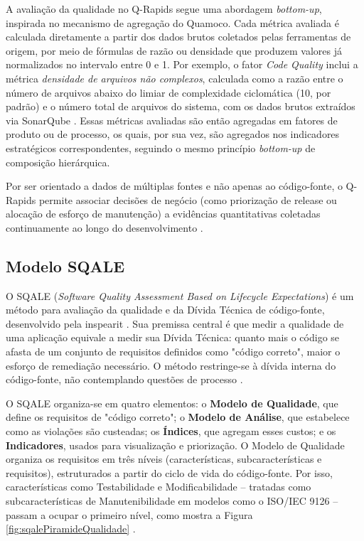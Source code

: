 A avaliação da qualidade no Q-Rapids segue uma abordagem \textit{bottom-up}, inspirada no mecanismo de agregação do Quamoco. Cada métrica avaliada é calculada diretamente a partir dos dados brutos coletados pelas ferramentas de origem, por meio de fórmulas de razão ou densidade que produzem valores já normalizados no intervalo entre 0 e 1. Por exemplo, o fator \textit{Code Quality} inclui a métrica \textit{densidade de arquivos não complexos}, calculada como a razão entre o número de arquivos abaixo do limiar de complexidade ciclomática (10, por padrão) e o número total de arquivos do sistema, com os dados brutos extraídos via SonarQube \cite{martinezfernandez2018qrapids}. Essas métricas avaliadas são então agregadas em fatores de produto ou de processo, os quais, por sua vez, são agregados nos indicadores estratégicos correspondentes, seguindo o mesmo princípio \textit{bottom-up} de composição hierárquica.

Por ser orientado a dados de múltiplas fontes e não apenas ao código-fonte, o Q-Rapids permite associar decisões de negócio (como priorização de release ou alocação de esforço de manutenção) a evidências quantitativas coletadas continuamente ao longo do desenvolvimento \cite{martinezfernandez2018qrapids}.

\subsection{Modelo SQALE}
\label{sec:sqale}

O SQALE (\textit{Software Quality Assessment Based on Lifecycle Expectations}) é um método para avaliação da qualidade e da Dívida Técnica de código-fonte, desenvolvido pela inspearit \cite{letouzey2012sqale}. Sua premissa central é que medir a qualidade de uma aplicação equivale a medir sua Dívida Técnica: quanto mais o código se afasta de um conjunto de requisitos definidos como "código correto", maior o esforço de remediação necessário. O método restringe-se à dívida interna do código-fonte, não contemplando questões de processo \cite{letouzey2012sqale}.

O SQALE organiza-se em quatro elementos: o \textbf{Modelo de Qualidade}, que define os requisitos de "código correto"; o \textbf{Modelo de Análise}, que estabelece como as violações são custeadas; os \textbf{Índices}, que agregam esses custos; e os \textbf{Indicadores}, usados para visualização e priorização. O Modelo de Qualidade organiza os requisitos em três níveis (características, subcaracterísticas e requisitos), estruturados a partir do ciclo de vida do código-fonte. Por isso, características como Testabilidade e Modificabilidade -- tratadas como subcaracterísticas de Manutenibilidade em modelos como o ISO/IEC 9126 -- passam a ocupar o primeiro nível, como mostra a Figura \ref{fig:sqalePiramideQualidade} \cite{letouzey2012sqale}.


